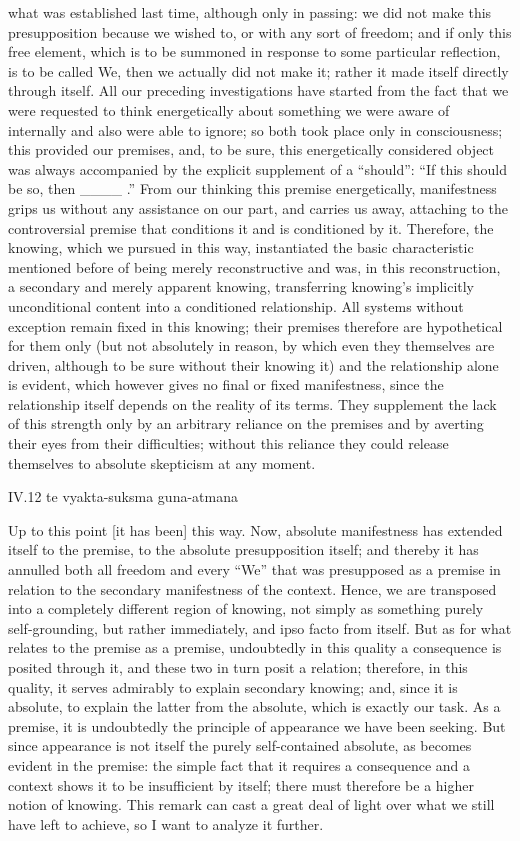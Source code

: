what was established last time,
although only in passing:
we did not make this presupposition
because we wished to,
or with any sort of freedom;
and if only this free element,
which is to be summoned in response to
some particular reflection,
is to be called We,
then we actually did not make it;
rather it made itself directly through itself.
All our preceding investigations have started from
the fact that we were requested to think energetically
about something we were aware of internally and
also were able to ignore;
so both took place only in consciousness;
this provided our premises, and, to be sure,
this energetically considered object was always
accompanied by the explicit supplement of a “should”:
“If this should be so, then ____ .”
From our thinking this premise energetically,
manifestness grips us without any assistance on our part,
and carries us away, attaching to the controversial premise
that conditions it and is conditioned by it.
Therefore, the knowing, which we pursued in this way,
instantiated the basic characteristic mentioned before
of being merely reconstructive and was, in this reconstruction,
a secondary and merely apparent knowing,
transferring knowing's implicitly unconditional content
into a conditioned relationship.
All systems without exception remain fixed in this knowing;
their premises therefore are hypothetical for them only
(but not absolutely in reason,
by which even they themselves are driven,
although to be sure without their knowing it)
and the relationship alone is evident,
which however gives no final or fixed manifestness,
since the relationship itself depends on
the reality of its terms.
They supplement the lack of this strength
only by an arbitrary reliance on the premises
and by averting their eyes from their difficulties;
without this reliance they could release themselves
to absolute skepticism at any moment.

IV.12
te vyakta-suksma guna-atmana

Up to this point [it has been] this way.
Now, absolute manifestness has extended itself to the premise,
to the absolute presupposition itself;
and thereby it has annulled both all freedom and
every “We” that was presupposed as a premise
in relation to the secondary manifestness of the context.
Hence, we are transposed into a
completely different region of knowing,
not simply as something purely self-grounding,
but rather immediately, and ipso facto from itself.
But as for what relates to the premise as a premise,
undoubtedly in this quality a consequence is posited through it,
and these two in turn posit a relation;
therefore, in this quality,
it serves admirably to
explain secondary knowing;
and, since it is absolute,
to explain the latter from the absolute,
which is exactly our task.
As a premise, it is undoubtedly
the principle of appearance we have been seeking.
But since appearance is not itself
the purely self-contained absolute,
as becomes evident in the premise:
the simple fact that it requires
a consequence and a context
shows it to be insufficient by itself;
there must therefore be a higher notion of knowing.
This remark can cast a great deal of light
over what we still have left to achieve,
so I want to analyze it further.

